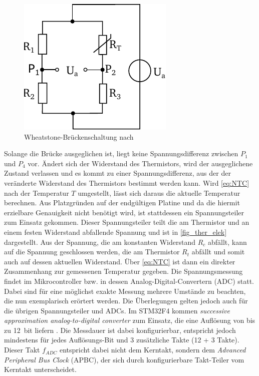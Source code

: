 \begin{figure} [h]
	\centering
	\includegraphics[width=0.4\linewidth]{Bilder/wheatstone.pdf}
	\caption{Wheatstone-Brückenschaltung nach \cite[S.12]{Weissgerber2018}}
	\label{fig:wheatstone}
\end{figure}\noindent
Solange die Brücke ausgeglichen ist, liegt keine Spannungsdifferenz zwischen $P_1$ und $P_4$ vor. Ändert sich der Widerstand des Thermistors, wird der ausgeglichene Zustand verlassen und es kommt zu einer Spannungsdifferenz, aus der der veränderte Widerstand des Thermistors bestimmt werden kann. Wird \autoref{eq:NTC} nach der Temperatur $T$ umgestellt, lässt sich daraus die aktuelle Temperatur berechnen. Aus Platzgründen auf der endgültigen Platine und da die hiermit erzielbare Genauigkeit nicht benötigt wird, ist stattdessen ein Spannungsteiler zum Einsatz gekommen. Dieser Spannungsteiler teilt die am Thermistor und an einem festen Widerstand abfallende Spannung und ist in \autoref{fig_ther_elek} dargestellt. Aus der Spannung, die am konstanten Widerstand $R_c$ abfällt, kann auf die Spannung geschlossen werden, die am Thermistor $R_t$ abfällt und somit auch auf dessen aktuellen Widerstand. Über \autoref{eq:NTC} ist dann ein direkter Zusammenhang zur gemessenen Temperatur gegeben.
Die Spannungsmessung findet im Mikrocontroller bzw. in dessen Analog-Digital-Convertern (ADC) statt. Dabei sind für eine möglichst exakte Messung mehrere Umstände zu beachten, die nun exemplarisch erörtert werden. Die Überlegungen gelten jedoch auch für die übrigen Spannungsteiler und ADCs. Im STM32F4 kommen \textit{successive approximation analog-to-digital converter} zum Einsatz, die eine Auflösung von bis zu \SI{12}{bit} liefern \cite{stmref}. Die Messdauer ist dabei konfigurierbar, entspricht jedoch mindestens für jedes Auflösungs-Bit und 3 zusätzliche Takte (12 + 3 Takte)\cite[S.397]{stmref}. Dieser Takt $f_{ADC}$ entspricht dabei nicht dem Kerntakt, sondern dem \textit{Advanced Peripheral Bus Clock} (APBC), der sich durch konfigurierbare Takt-Teiler vom Kerntakt unterscheidet. \\
